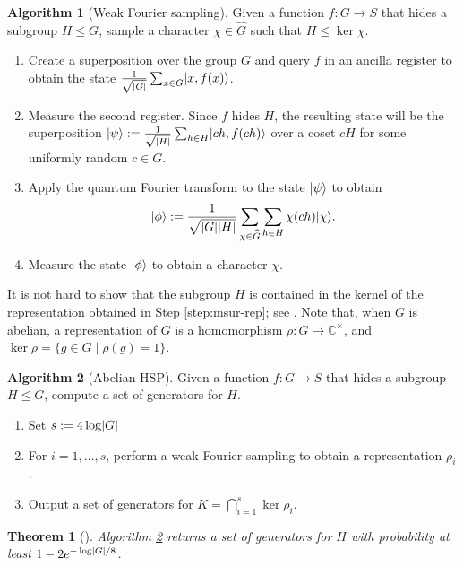 \documentclass[11pt]{article}
\theoremstyle{plain}
\newtheorem{theorem}{Theorem}[section]
\theoremstyle{definition}
\newtheorem{algo-thm}{Algorithm}
\DeclarePairedDelimiter{\abs}{\lvert}{\rvert}
\DeclarePairedDelimiter{\ket}{\lvert}{\rangle}
\def\C{\mathbb{C}}
\begin{document}
\begin{algo-thm}[Weak Fourier sampling]
	\label{alg:wfs}
	Given a function $f: G \rightarrow S$ that hides a subgroup $H \le G$, sample a	character $\chi \in \widehat{G}$ such that $H \le \ker\chi$.
	\begin{enumerate}[topsep = 0pt, itemsep = 0pt, parsep = 0pt]
		\item Create a superposition over the group $G$ and query $f$ in an ancilla register to 
		obtain the state $\frac{1}{\sqrt{\abs{G}}} \sum_{x \in G} \ket{x, f(x)}$.
		\item Measure the second register. Since $f$ hides $H$, the resulting state will be the  
		superposition $\ket{\psi} := \frac{1}{\sqrt{\abs{H}}} \sum_{h \in H} \ket{ch, f(ch)}$ 
		over a coset $cH$ for some uniformly random $c \in G$.
		\item Apply the quantum Fourier transform to the state $\ket{\psi}$ to obtain
		\[ \ket{\phi} := \frac{1}{\sqrt{\abs{G}\abs{H}}} \sum_{\chi \in \widehat{G}} \sum_{h \in H} 
		\chi(ch) \ket{\chi}. \]
		\item\label{step:msur-rep} Measure the state $\ket{\phi}$ to obtain a character $\chi$.
	\end{enumerate}
\end{algo-thm}

It is not hard to show that the subgroup $H$ is contained in the kernel of the representation 
obtained in Step \ref{step:msur-rep}; see \cite{hallgren2003hidden}. Note that, when $G$ is abelian, 
a representation of $G$ is a homomorphism $\rho: G \rightarrow \C^\times$, and $\ker \rho = \{ g \in 
G \mid \rho(g) = 1 \}$. 

\begin{algo-thm}[Abelian HSP]
	\label{alg:ahsp}
	Given a function $f: G \rightarrow S$ that hides a subgroup $H \le G$, compute a set of 
	generators for $H$.
	\begin{enumerate}[topsep = 0pt, itemsep = 0pt, parsep = 0pt]
		\item Set $s := 4\log \abs{G}$
		\item\label{step:hsp:loop} For $i = 1, \dots, s$, perform a weak Fourier sampling to obtain 
		a representation $\rho_i$.
		\item\label{step:ker} Output a set of generators for $K = \bigcap_{i = 1}^s \ker \rho_i$.
	\end{enumerate}
\end{algo-thm}

\begin{theorem}[{\cite[Theorem 4.3]{hallgren2003hidden}}]
	Algorithm \ref{alg:ahsp} returns a set of generators for $H$ with probability at least $1 - 
	2e^{-\log \abs{G} / 8}$.
\end{theorem}
\end{document}
